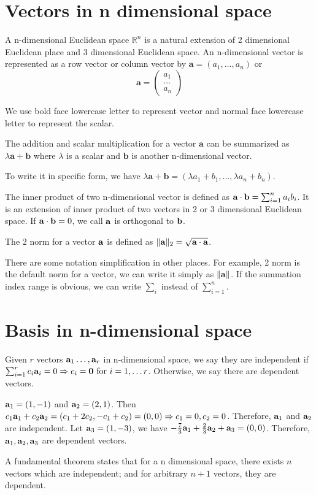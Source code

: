 \section{Vectors in n dimensional space}
A n-dimensional Euclidean space $\mathbb{R}^n$ is a natural extension of 2 dimensional Euclidean place and 3 dimensional Euclidean space. An n-dimensional vector is represented as a row vector or column vector by $\mathbf{a} = (a_1, \dots, a_n)$ or 
$$
\mathbf{a} = \begin{pmatrix} a_1 \\ \dots \\ a_n \end{pmatrix}
$$

We use bold face lowercase letter to represent vector and normal face lowercase letter to represent the scalar.

The addition and scalar multiplication for a vector $\mathbf{a}$ can be summarized as $\lambda \mathbf{a} + \mathbf{b}$ where $\lambda$ is a scalar and $\mathbf{b}$ is another n-dimensional vector.

To write it in specific form, we have $\lambda \mathbf{a} + \mathbf{b} = (\lambda a_1 + b_1, \dots, \lambda a_n + b_n)$.

The inner product of two n-dimensional vector is defined as $\mathbf{a} \cdot \mathbf{b} = \sum_{i=1}^n a_i b_i$. It is an extension of inner product of two vectors in 2 or 3 dimensional Euclidean space. If $\mathbf{a} \cdot \mathbf{b} = 0 $, we call $\mathbf{a}$ is orthogonal to $\mathbf{b}$.

The 2 norm for a vector $\mathbf{a}$ is defined as $\lVert\mathbf{a}\rVert_2 = \sqrt{\mathbf{a}\cdot \mathbf{a}}$.

There are some notation simplification in other places. For example, 2 norm is the default norm for a vector, we can write it simply as $\lVert\mathbf{a}\rVert$. If the summation index range is obvious, we can write $\sum_{i}$ instead of $\sum_{i=1}^n$.

\section{Basis in n-dimensional space}
Given $r$ vectors $\mathbf{a}_1 \dots, \mathbf{a}_r$ in n-dimensional space, we say they are independent if $ \sum_{i=1}^r c_i \mathbf{a}_i = 0 \Rightarrow c_i = \mathbf{0} \textrm{ for } i=1,\dots r$.
Otherwise, we say there are dependent vectors.
\begin{example}
$\mathbf{a}_1 = (1, -1)$ and $\mathbf{a}_2 = (2, 1)$. Then $c_1 \mathbf{a}_1 + c_2 \mathbf{a}_2 = (c_1 + 2 c_2, -c_1 + c_2 ) = (0,0) \Rightarrow c_1 = 0, c_2 = 0$. Therefore, $\mathbf{a}_1$ and $\mathbf{a}_2$ are independent. Let $\mathbf{a}_3 = (1, -3)$, we have $-\frac{7}{3} \mathbf{a}_1 + \frac{2}{3} \mathbf{a}_2 + \mathbf{a}_3 = (0,0)$. Therefore, $\mathbf{a}_1, \mathbf{a}_2, \mathbf{a}_3$ are dependent vectors.
\end{example}
A fundamental theorem states that for a n dimensional space, there exists $n$ vectors which are independent; and for arbitrary $n+1$ vectors, they are dependent.

